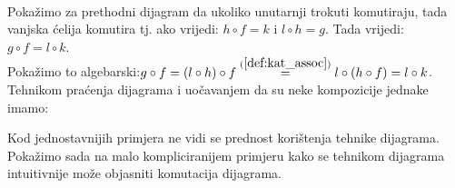 \begin{example}\ \\

    \noindent Pokažimo za prethodni dijagram da ukoliko unutarnji trokuti
    komutiraju, tada vanjska ćelija komutira tj. ako vrijedi: $h \circ f = k$ i $ l \circ h = g$.
    Tada vrijedi: $g \circ f = l \circ k$.\\
    Pokažimo to algebarski:$g \circ f = (l \circ h) \circ f \overset{(\ref{def:kat_assoc})}{=} l \circ (h \circ f) = l \circ k$.
    Tehnikom praćenja dijagrama i uočavanjem da su neke kompozicije jednake
    imamo:
    \begin{center}
    \end{center}
\end{example}

  Kod jednostavnijih primjera ne vidi se prednost korištenja tehnike dijagrama.
  Pokažimo sada na malo kompliciranijem primjeru kako se tehnikom dijagrama
  intuitivnije može objasniti komutacija dijagrama.\\

